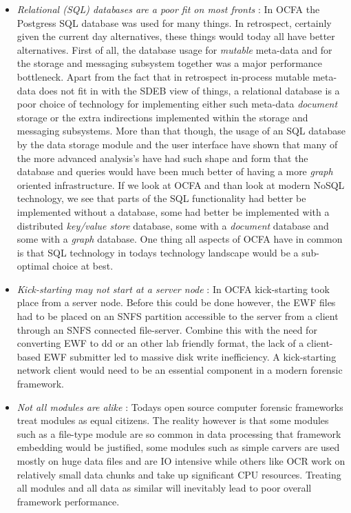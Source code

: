 \begin{itemize}
\item \emph{Relational (SQL) databases are a poor fit on most fronts} : In OCFA the Postgress SQL database was used for many things. In retrospect, certainly given the current day alternatives, these things would today all have better alternatives. First of all, the database usage for \emph{mutable} meta-data and for the storage and messaging subsystem together was a major performance bottleneck. Apart from the fact that in retrospect in-process mutable meta-data does not fit in with the SDEB view of things, a relational database is a poor choice of technology for implementing either such meta-data \emph{document} storage or the extra indirections implemented within the storage and messaging subsystems. More than that though, the usage of an SQL database by the data storage module and the user interface have shown that many of the more advanced analysis's have had such shape and form that the database and queries would have been much better of having a more \emph{graph} oriented infrastructure. If we look at OCFA and than look at modern NoSQL technology, we see that parts of the SQL functionality had better be implemented without a database, some had better be implemented with a distributed \emph{key/value store} database, some with a \emph{document} database and some with a \emph{graph} database.  One thing all aspects of OCFA have in common is that SQL technology in todays technology landscape would be a sub-optimal choice at best. 
\item \emph{Kick-starting may not start at a server node} : In OCFA kick-starting took place from a server node. Before this could be done however, the EWF files had to be placed on an SNFS partition accessible to the server from a client through an SNFS connected file-server. Combine this with the need for converting EWF to dd or an other lab friendly format, the lack of a client-based EWF submitter led to massive disk write inefficiency. A kick-starting network client would need to be an essential component in a modern forensic framework.
\item \emph{Not all modules are alike} : Todays open source computer forensic frameworks treat modules as equal citizens. The reality however is that some modules such as a file-type module are so common in data processing that framework embedding would be justified, some modules such as simple carvers are used mostly on huge data files and are IO intensive while others like OCR work on relatively small data chunks and take up significant CPU resources. Treating all modules and all data as similar will inevitably lead to poor overall framework performance. 

\end{itemize}
